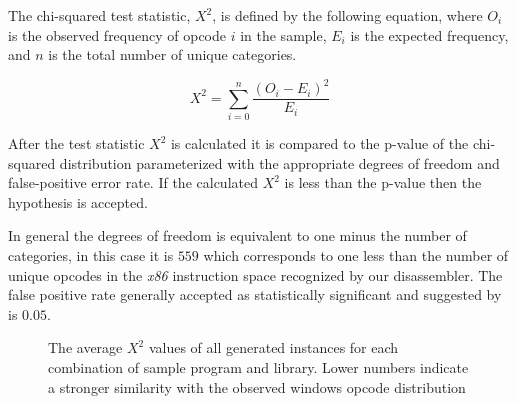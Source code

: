 
    The chi-squared test statistic, $X^2$, is defined by the following
    equation, where $O_i$ is the observed frequency of opcode $i$ in the
    sample, $E_i$ is the expected frequency, and $n$ is the total number of
    unique categories.

    $$X^2 = \sum_{i=0}^{n} \frac{(O_i - E_i)^2}{E_i}$$

    After the test statistic $X^2$ is calculated it is compared to the
    p-value of the chi-squared distribution parameterized with the
    appropriate degrees of freedom and false-positive error rate. If the
    calculated $X^2$ is less than the p-value then the hypothesis is
    accepted.

    In general the degrees of freedom is equivalent to one minus the number
    of categories, in this case it is $559$ which corresponds to one less
    than the number of unique opcodes in the \emph{x86} instruction space
    recognized by our disassembler. The false positive rate generally
    accepted as statistically significant and suggested by \cite{chisquared}
    is $0.05$.

    \begin{figure}[t!]
        \vspace{-50pt}
        \caption[Results for blending in with benign programs]
        {The average $X^2$ values of all generated instances for each
        combination of sample program and library. Lower numbers indicate a
        stronger similarity with the observed windows opcode distribution}
        \label{tab:results-windows-like-avg}
    \end{figure}

